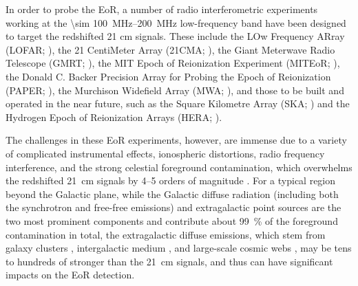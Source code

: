 \documentclass[modern]{aastex61}
\begin{document}
In order to probe the EoR, a number of radio interferometric experiments
working at the \SIrange{\sim 100}{200}{\MHz} low-frequency band have been
designed to target the redshifted 21 cm signals.
These include the LOw Frequency ARray (LOFAR; \citealt{vanHaarlem2013}),
the 21 CentiMeter Array (21CMA; \citealt{zheng2016}),
the Giant Meterwave Radio Telescope (GMRT; \citealt{paciga2011}),
the MIT Epoch of Reionization Experiment (MITEoR; \citealt{zheng2014}),
the Donald C. Backer Precision Array for Probing the Epoch of
Reionization (PAPER; \citealt{parsons2010}),
the Murchison Widefield Array (MWA; \citealt{bowman2013,tingay2013}),
and those to be built and operated in the near future, such as the Square
Kilometre Array (SKA; \citealt{mellema2013rev,koopmans2015rev}) and
the Hydrogen Epoch of Reionization Arrays (HERA; \citealt{deboer2017}).

The challenges in these EoR experiments, however, are immense
due to a variety of complicated instrumental effects,
ionospheric distortions, radio frequency interference, and the
strong celestial foreground contamination, which overwhelms the
redshifted 21~cm signals by \numrange{4}{5} orders of magnitude
\citep[e.g.,][]{beardsley2016,murray2017,procopio2017}.
For a typical region beyond the Galactic plane,
while the Galactic diffuse radiation (including both the synchrotron
and free-free emissions) and extragalactic point sources are the two
most prominent components and contribute about \SI{99}{\percent} of
the foreground contamination in total, the extragalactic diffuse emissions,
which stem from galaxy clusters \citep[e.g.,][]{feretti2012rev,kale2016rev},
intergalactic medium \citep[e.g.,][]{keshet2004}, and large-scale cosmic
webs \citep[e.g.,][]{arayaMelo2012,vazza2015},
may be tens to hundreds of stronger than the 21~cm signals,
and thus can have significant impacts on the EoR detection.
\end{document}
